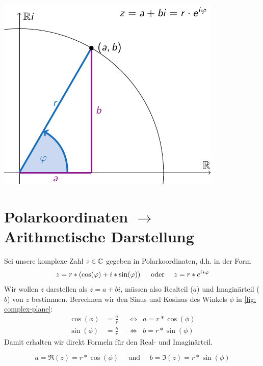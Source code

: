 \documentclass[ngerman, a4paper, 11pt]{article}
\theoremstyle{nonumberplain}
\renewcommand{\i}{i}
\begin{document}
	\begin{center}
		\includegraphics[scale=1]{complex-plane}
		\label{fig: complex-plane}
	\end{center}
	
	\section*{Polarkoordinaten $\to$ Arithmetische Darstellung}
	
	Sei unsere komplexe Zahl $z \in \mathbb{C}$ gegeben in Polarkoordinaten, d.h. in der Form
	\begin{equation*}
		z = r * \brackets{\cos(\phi) + \i * \sin(\phi)} 
		\quad \text{ oder } \quad
		z = r * e^{\i * \phi}
	\end{equation*}
	Wir wollen $z$ darstellen als $z = a + b \i$, müssen also Realteil ($a$) und Imaginärteil ($b$) von $z$ bestimmen. 
	Berechnen wir den Sinus und Kosinus des Winkels $\phi$ in \cref{fig: complex-plane}:
	\begin{equation}
		\begin{aligned}
			\cos(\phi) &= \frac{a}{r} &&\Leftrightarrow & a = r * \cos(\phi) \\
			\sin(\phi) &= \frac{b}{r} &&\Leftrightarrow & b = r * \sin(\phi) 	
		\end{aligned}	
	\tag{$\star$} \label{eq: sin-cos}
	\end{equation}
	Damit erhalten wir direkt Formeln für den Real- und Imaginärteil.
	
	\begin{tcolorbox}[colback=cdorange!10,colframe=cdorange]
		\begin{equation*}
			a = \Re(z) = r * \cos(\phi) 
			\quad \text{ und } \quad 
			b = \Im(z) = r * \sin(\phi) 
		\end{equation*}
	\end{tcolorbox}
\end{document}
